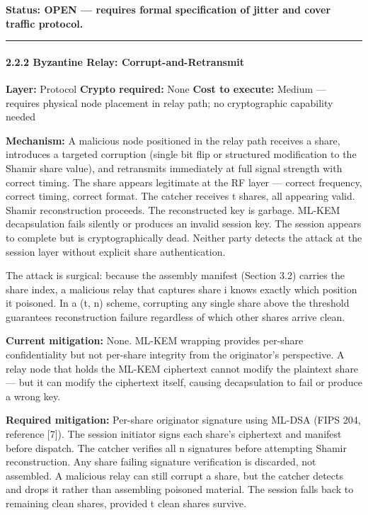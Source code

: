 \documentclass[
  11pt,
]{article}
\begin{document}
\textbf{Status: OPEN --- requires formal specification of jitter and
cover traffic protocol.}

\begin{center}\rule{0.5\linewidth}{0.5pt}\end{center}

\hypertarget{byzantine-relay-corrupt-and-retransmit}{%
\paragraph{2.2.2 Byzantine Relay:
Corrupt-and-Retransmit}\label{byzantine-relay-corrupt-and-retransmit}}

\textbf{Layer:} Protocol \textbf{Crypto required:} None \textbf{Cost to
execute:} Medium --- requires physical node placement in relay path; no
cryptographic capability needed

\textbf{Mechanism:} A malicious node positioned in the relay path
receives a share, introduces a targeted corruption (single bit flip or
structured modification to the Shamir share value), and retransmits
immediately at full signal strength with correct timing. The share
appears legitimate at the RF layer --- correct frequency, correct
timing, correct format. The catcher receives t shares, all appearing
valid. Shamir reconstruction proceeds. The reconstructed key is garbage.
ML-KEM decapsulation fails silently or produces an invalid session key.
The session appears to complete but is cryptographically dead. Neither
party detects the attack at the session layer without explicit share
authentication.

The attack is surgical: because the assembly manifest (Section 3.2)
carries the share index, a malicious relay that captures share i knows
exactly which position it poisoned. In a (t, n) scheme, corrupting any
single share above the threshold guarantees reconstruction failure
regardless of which other shares arrive clean.

\textbf{Current mitigation:} None. ML-KEM wrapping provides per-share
confidentiality but not per-share integrity from the originator's
perspective. A relay node that holds the ML-KEM ciphertext cannot modify
the plaintext share --- but it can modify the ciphertext itself, causing
decapsulation to fail or produce a wrong key.

\textbf{Required mitigation:} Per-share originator signature using
ML-DSA (FIPS 204, reference {[}7{]}). The session initiator signs each
share's ciphertext and manifest before dispatch. The catcher verifies
all n signatures before attempting Shamir reconstruction. Any share
failing signature verification is discarded, not assembled. A malicious
relay can still corrupt a share, but the catcher detects and drops it
rather than assembling poisoned material. The session falls back to
remaining clean shares, provided t clean shares survive.
\end{document}
